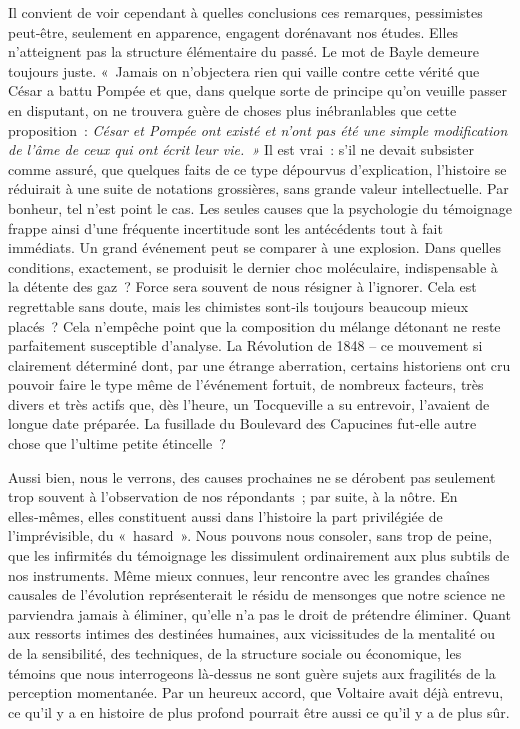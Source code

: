 \documentclass[french,twoside]{book} %
\begin{document}
Il convient de voir cependant à quelles conclusions ces remarques, pessimistes peut‑être, seulement en apparence, engagent dorénavant nos études. Elles n’atteignent pas la structure élémentaire du passé. Le mot de Bayle demeure toujours juste. « Jamais on n’objectera rien qui vaille contre cette vérité que César a battu Pompée et que, dans quelque sorte de principe qu’on veuille passer en disputant, on ne trouvera guère de choses plus inébranlables que cette proposition : \emph{César et Pompée ont existé et n’ont pas été une simple modification de l’âme de ceux qui ont écrit leur vie. »} Il est vrai : s’il ne devait subsister comme assuré, que quelques faits de ce type dépourvus d’explication, l’histoire se réduirait à une suite de notations grossières, sans grande valeur intellectuelle. Par bon­heur, tel n’est point le cas. Les seules causes que la psychologie du témoi­gnage frappe ainsi d’une fréquente incertitude sont les antécédents tout à fait immédiats. Un grand événement peut se comparer à une explosion. Dans quelles conditions, exactement, se produisit le dernier choc molé­culaire, indispensable à la détente des gaz ? Force sera souvent de nous résigner à l’ignorer. Cela est regrettable sans doute, mais les chimistes sont‑ils toujours beaucoup mieux placés ? Cela n’empêche point que la composition du mélange détonant ne reste parfaitement susceptible d’ana­lyse. La Révolution de 1848 – ce mouvement si clairement déterminé dont, par une étrange aberration, certains historiens ont cru pouvoir faire le type même de l’événement fortuit, de nombreux facteurs, très divers et très actifs que, dès l’heure, un Tocqueville a su entrevoir, l’avaient de longue date préparée. La fusillade du Boulevard des Capucines fut‑elle autre chose que l’ultime petite étincelle ?\par
Aussi bien, nous le verrons, des causes prochaines ne se dérobent pas seulement trop souvent à l’observation de nos répondants ; par suite, à la nôtre. En elles‑mêmes, elles constituent aussi dans l’histoire la part privilégiée de l’imprévisible, du « hasard ». Nous pouvons nous consoler, sans trop de peine, que les infirmités du témoignage les dissimulent  
\label{p49} ordinairement aux plus subtils de nos instruments. Même mieux connues, leur rencontre avec les grandes chaînes causales de l’évolution représenterait le résidu de mensonges que notre science ne parviendra jamais à éliminer, qu’elle n’a pas le droit de prétendre éliminer. Quant aux res­sorts intimes des destinées humaines, aux vicissitudes de la mentalité ou de la sensibilité, des techniques, de la structure sociale ou économique, les témoins que nous interrogeons là‑dessus ne sont guère sujets aux fra­gilités de la perception momentanée. Par un heureux accord, que Voltaire avait déjà entrevu, ce qu’il y a en histoire de plus profond pourrait être aussi ce qu’il y a de plus sûr.\par
\end{document}
